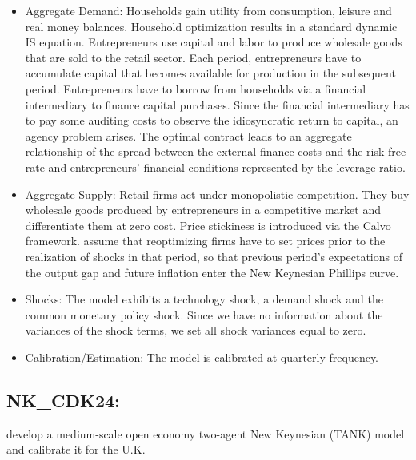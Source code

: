 \documentclass[11pt,a4paper]{article}
\begin{document}
	\begin{itemize}
		
		\item Aggregate Demand: Households gain utility from consumption, leisure and real money balances. Household optimization results in a standard dynamic IS equation. Entrepreneurs use capital and labor to produce wholesale goods that are sold to the retail sector. Each period, entrepreneurs have to accumulate capital that becomes available for production in the subsequent period. Entrepreneurs have to borrow from households via a financial intermediary to finance capital purchases. Since the financial intermediary has to pay some auditing costs to observe the idiosyncratic return to capital, an agency problem arises. The optimal contract leads to an aggregate relationship of the spread between the external finance costs and the risk-free rate and entrepreneurs' financial conditions represented by the leverage ratio.
		
		\item Aggregate Supply: Retail firms act under monopolistic competition. They buy wholesale goods produced by entrepreneurs in a competitive market and differentiate them at zero cost. Price stickiness is introduced via the Calvo framework. \cite{BernankeGertlerGilchrist1999} assume that reoptimizing firms have to set prices prior to the realization of shocks in that period, so that previous period's expectations of the output gap and future inflation enter the New Keynesian Phillips curve.
		
		\item Shocks: The model exhibits a technology shock, a demand shock and the common monetary policy shock. Since we have no information about the variances of the shock terms, we set all shock variances equal to zero.
		
		\item Calibration/Estimation: The model is calibrated at quarterly frequency.
		
		
	\end{itemize}
	
	
	\subsection{NK\_CDK24: \texorpdfstring{\cite{chan2024energy}}{Chan et al. (2024)}}
	\label{NKCDK24}
	
	\cite{chan2024energy} develop a medium-scale open economy two-agent New Keynesian (TANK) model and calibrate it for the U.K.
	
\end{document}
